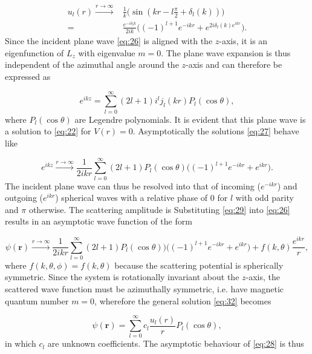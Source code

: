 \documentclass{article}
\numberwithin{equation}{section}
\begin{document}
\begin{equation}
\begin{split}
u_l(r) \xrightarrow{r \to \infty} &\frac{1}{k}\big(\sin(kr - l\frac{\pi}{2} + \delta_l(k))\big)\\
=&\frac{e^{-i\delta_l{k}}}{2ik}\big((-1)^{l+1}e^{-ikr} + e^{2i\delta_l(k)e^{ikr}}\big).
\end{split}
\end{equation}
Since the incident plane wave \eqref{eq:26} is aligned with the $z$-axis, it is an eigenfunction of $L_z$ with eigenvalue $m=0$. The plane wave expansion is thus independent of the azimuthal angle around the $z$-axis and can therefore be expressed as

\begin{equation}\label{eq:27}
e^{ikz} = \sum_{l=0}^{\infty} (2l+1)i^l j_l(kr)P_l(\cos\theta),
\end{equation}
where $P_l(\cos\theta)$ are Legendre polynomials. It is evident that this plane wave is a solution to \eqref{eq:22} for $V(r) = 0$. Asymptotically the solutions \eqref{eq:27} behave like

\begin{equation}\label{eq:29}
e^{ikz} \xrightarrow{r \to \infty} \frac{1}{2ikr} \sum_{l=0}^{\infty} (2l+1)P_l(\cos\theta)\big((-1)^{l+1}e^{-ikr} + e^{ikr}\big).
\end{equation}
The incident plane wave can thus be resolved into that of incoming ($e^{-ikr}$) and outgoing ($e^{ikr}$) spherical waves with a relative phase of $0$ for $l$ with odd parity and $\pi$ otherwise. The scattering amplitude is Substituting \eqref{eq:29} into \eqref{eq:26} results in an asymptotic wave function of the form

\begin{equation}\label{eq:30}
\psi(\mathbf{r}) \xrightarrow{r \to \infty} \frac{1}{2ikr}\sum_{l=0}^{\infty} (2l+1)P_l(\cos\theta))\big((-1)^{l+1}e^{-ikr} + e^{ikr}\big) + f(k, \theta) \frac{e^{ikr}}{r},
\end{equation} 
where $f(k,\theta,\phi)=f(k,\theta)$ because the scattering potential is spherically symmetric. Since the system is rotationally invariant about the $z$-axis, the scattered wave function must be azimuthally symmetric, i.e. have magnetic quantum number $m=0$, wherefore the general solution \eqref{eq:32} becomes

\begin{equation}\label{eq:28}
\psi(\mathbf{r}) = \sum_{l=0}^{\infty} c_l \frac{u_l(r)}{r} P_l(\cos\theta),
\end{equation} 
in which $c_l$ are unknown coefficients. The asymptotic behaviour of \eqref{eq:28} is thus
\end{document}
